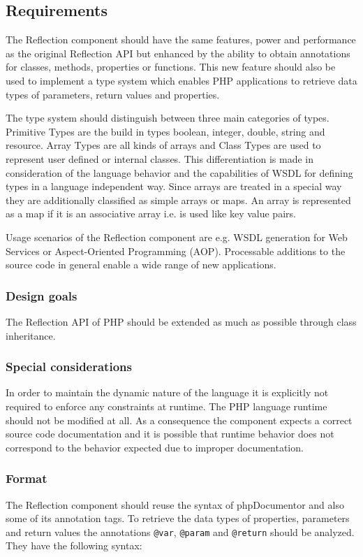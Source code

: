 \documentclass[10pt,final,a4paper,oneside]{article}
\begin{document}
\subsection{Requirements}\label{subsec:ReflectionRequirements}
The Reflection component should have
the same features, power and performance
as the original Reflection API
but enhanced by the ability to obtain annotations
for classes, methods, properties or functions.
This new feature should also be used
to implement a type system
which enables PHP applications to retrieve
data types of parameters, return values and properties.

The type system should distinguish between three main categories of types.
Primitive Types are the build in types boolean, integer, double, string and resource.
Array Types are all kinds of arrays and
Class Types are used to represent user defined or internal classes.
This differentiation is made
in consideration of the language behavior
and the capabilities of WSDL for defining types
in a language independent way.
Since arrays are treated in a special way
they are additionally classified as simple arrays or maps.
An array is represented as a map if it is an associative array
i.e. is used like key value pairs.

Usage scenarios of the Reflection component are
e.g. WSDL generation for Web Services
or Aspect-Oriented Programming (AOP).
Processable additions to the source code in general
enable a wide range of new applications.

\subsubsection{Design goals}
The Reflection API of PHP should be extended
as much as possible through class inheritance.

\subsubsection{Special considerations}
In order to maintain the dynamic nature of the language
it is explicitly not required
to enforce any constraints at runtime.
The PHP language runtime should not be modified at all.
As a consequence the component expects a correct source code documentation
and it is possible that runtime behavior does not correspond
to the behavior expected due to improper documentation.

\subsubsection{Format}\label{subsubsec:ReflectionFormat}
The Reflection component should reuse the syntax
of phpDocumentor \cite{phpDocumentor}
and also some of its annotation tags.
To retrieve the data types of properties,
parameters and return values the annotations
\verb|@var|,
\verb|@param| and
\verb|@return| should be analyzed.
They have the following syntax:
\end{document}
